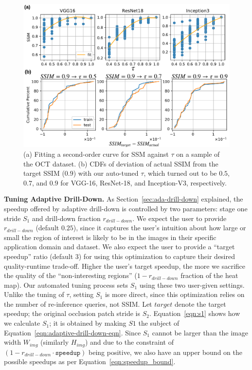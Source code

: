 \begin{figure}[t]
\includegraphics[width=\columnwidth]{images/system_tuning}
\vspace{-8mm}
\caption{(a) Fitting a second-order curve for SSM against $\tau$ on a sample of the OCT dataset. 
(b) CDFs of deviation of actual SSIM from the target SSIM ($0.9$) with our auto-tuned $\tau$, which turned out to be $0.5$, $0.7$, and $0.9$ for VGG-16, ResNet-18, and Inception-V3, respectively.}
\label{fig:system_tuning}
\vspace{-4mm}
\end{figure}

\vspace{2mm}
\noindent \textbf{Tuning Adaptive Drill-Down.}
As Section~\ref{sec:ada-drill-down} explained, the speedup offered by adaptive drill-down is controlled by two parameters: stage one stride $S_1$ and drill-down fraction $r_{\mathit{drill}-\mathit{down}}$. We expect the user to provide $r_{\mathit{drill}-\mathit{down}}$ (default $0.25$), since it captures the user's intuition about how large or small the region of interest is likely to be in the images in their specific application domain and dataset. We also expect the user to provide a ``target speedup'' ratio (default $3$) for using this optimization to capture their desired quality-runtime trade-off. Higher the user's target speedup, the more we sacrifice the quality of the ``non-interesting regions'' ($1 - r_{\mathit{drill}-\mathit{down}}$ fraction of the heat map). Our automated tuning process sets $S_1$ using these two user-given settings. Unlike the tuning of $\tau$, setting $S_1$ is more direct, since this optimization relies on the number of re-inference queries, not SSIM. Let $\mathit{target}$ denote the target speedup; the original occlusion patch stride is $S_2$. Equation~\ref{eqn:s1} shows how we calculate $S_1$; it is obtained by making $S1$ the subject of Equation~\ref{eqn:adaptive-drill-down-eqn}. Since $S_1$ cannot be larger than the image width $W_\mathit{img}$ (similarly $H_\mathit{img}$) and due to the constraint of $(1-r_{\mathit{drill}-\mathit{down}} \cdot \texttt{speedup})$ being positive, we also have an upper bound on the possible speedups as per Equation~\ref{eqn:speedup_bound}.

